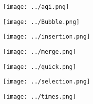  
\texttt{[image: ../aqi.png]}


\texttt{[image: ../Bubble.png]}


\texttt{[image: ../insertion.png]}


\texttt{[image: ../merge.png]}


\texttt{[image: ../quick.png]}


\texttt{[image: ../selection.png]}


\texttt{[image: ../times.png]}


 